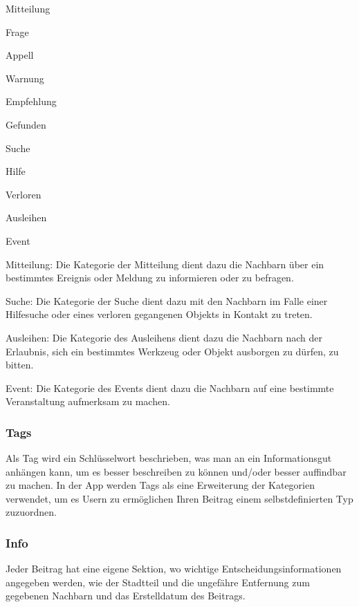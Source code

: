 \begin{compactitem}
  \item Mitteilung
  \begin{compactitem}
    \item Frage
    \item Appell
    \item Warnung
    \item Empfehlung
    \item Gefunden
  \end{compactitem}
  \item Suche
  \begin{compactitem}
    \item Hilfe
    \item Verloren
  \end{compactitem}
  \item Ausleihen
  \item Event
\end{compactitem}



Mitteilung:
Die Kategorie der Mitteilung dient dazu die Nachbarn über ein bestimmtes Ereignis oder Meldung zu informieren oder zu befragen.

Suche:
Die Kategorie der Suche dient dazu mit den Nachbarn im Falle einer Hilfesuche oder eines verloren gegangenen Objekts in Kontakt zu treten.

Ausleihen:
Die Kategorie des Ausleihens dient dazu die Nachbarn nach der Erlaubnis, sich ein bestimmtes Werkzeug oder Objekt ausborgen zu dürfen, zu bitten.

Event:
Die Kategorie des Events dient dazu die Nachbarn auf eine bestimmte Veranstaltung aufmerksam zu machen.


\subsubsection{Tags}
Als Tag wird ein Schlüsselwort beschrieben, was man an ein Informationsgut anhängen kann, um es besser beschreiben zu können und/oder besser auffindbar zu machen. In der App werden Tags als eine Erweiterung der Kategorien verwendet, um es Usern zu ermöglichen Ihren Beitrag einem selbstdefinierten Typ zuzuordnen.

\subsubsection{Info}
Jeder Beitrag hat eine eigene Sektion, wo wichtige Entscheidungsinformationen angegeben werden, wie der Stadtteil und die ungefähre Entfernung zum gegebenen Nachbarn und das Erstelldatum des Beitrags.

